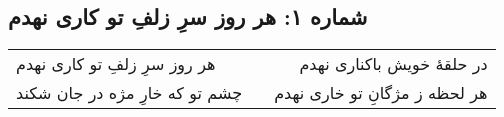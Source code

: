 \begin{center}
\section*{شماره ۱: هر روز سرِ زلفِ تو کاری نهدم}
\label{sec:001}
\begin{longtable}{l p{0.5cm} r}
هر روز سرِ زلفِ تو کاری نهدم
&&
در حلقهٔ خویش باکناری نهدم
\\
چشم تو که خارِ مژه در جان شکند
&&
هر لحظه ز مژگانِ تو خاری نهدم
\\
\end{longtable}
\end{center}
